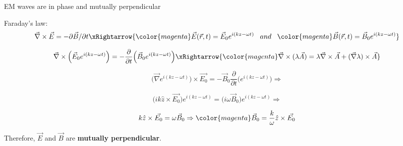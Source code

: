 %
%
%

\begin{frame}{EM waves are in phase and mutually perpendicular}

Faraday's law:
\begin{equation*}
   \vec{\nabla} \times \vec{E} = - \partial \vec{B} / \partial t
   \xRightarrow{
     {\color{magenta} \vec{E}(\vec{r},t) = \vec{E}_0  e^{i (kz-\omega t)}  }
     \;\;\; and \;\;\;
     {\color{magenta} \vec{B}(\vec{r},t) = \vec{B}_0  e^{i (kz-\omega t)}  }
   }
\end{equation*}

\begin{equation*}
   \vec{\nabla} \times \Big( \vec{E}_0  e^{i (kz-\omega t)} \Big)
   = - \frac{\partial}{\partial t} \Big( \vec{B}_0  e^{i (kz-\omega t)} \Big)
   \xRightarrow{
     {\color{magenta}
      \vec{\nabla} \times (\lambda \vec{A}) = \lambda \vec{\nabla} \times \vec{A} + (\vec{\nabla}\lambda) \times \vec{A}}}
\end{equation*}

\begin{equation*}
   \Big(\vec{\nabla} e^{i (kz-\omega t)} \Big) \times \vec{E_0} =
    - \vec{B}_0 \frac{\partial}{\partial t} \Big( e^{i (kz-\omega t)} \Big) \Rightarrow
\end{equation*}

\begin{equation*}
   \Big(ik \hat{z} \times \vec{E_0} \Big) e^{i (kz-\omega t)} =
    \Big( i\omega \vec{B}_0 \Big) e^{i (kz-\omega t)} \Rightarrow
\end{equation*}

\begin{equation*}
     k \hat{z} \times \vec{E_0} = \omega \vec{B}_0 \Rightarrow
     {\color{magenta} \vec{B}_0 = \frac{k}{\omega} \hat{z} \times \vec{E_0}}
\end{equation*}

Therefore, $\vec{E}$ and $\vec{B}$ are {\bf mutually perpendicular}.

\end{frame}

%
%
%

